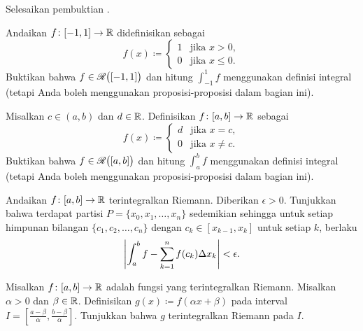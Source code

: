 \begin{exercise}
Selesaikan pembuktian .
\end{exercise}

\begin{exercise}
Andaikan $f \colon [-1,1] \to {\mathbb{R}}$ didefinisikan sebagai
\begin{equation*}
f(x) \coloneqq
\begin{cases}
1 & \text{jika } x > 0, \\
0 & \text{jika } x \leq 0.
\end{cases}
\end{equation*}
Buktikan bahwa $f \in {\mathscr{R}}\bigl([-1,1]\bigr)$ dan
hitung $\int_{-1}^1 f$ menggunakan definisi integral
(tetapi
Anda boleh menggunakan proposisi-proposisi dalam bagian ini).
\end{exercise}

\begin{exercise}
Misalkan $c \in (a,b)$ dan $d \in {\mathbb{R}}$.
Definisikan $f \colon [a,b] \to {\mathbb{R}}$ sebagai
\begin{equation*}
f(x) \coloneqq
\begin{cases}
d & \text{jika } x = c, \\
0 & \text{jika } x \neq c.
\end{cases}
\end{equation*}
Buktikan bahwa $f \in {\mathscr{R}}\bigl([a,b]\bigr)$ dan
hitung
$\int_a^b f$ menggunakan definisi integral
(tetapi
Anda boleh menggunakan proposisi-proposisi dalam bagian ini).
\end{exercise}

\begin{exercise} \label{exercise:taggedpartition}
Andaikan $f \colon [a,b] \to {\mathbb{R}}$ terintegralkan Riemann.  Diberikan $\epsilon
> 0$.  Tunjukkan bahwa terdapat partisi $P = \{ x_0, x_1,
\ldots, x_n \}$
sedemikian sehingga untuk setiap
himpunan bilangan $\{ c_1, c_2, \ldots, c_n \}$ dengan
$c_k \in [x_{k-1},x_k]$ untuk setiap $k$, berlaku
\begin{equation*}
\left\lvert {\int_a^b f - \sum_{k=1}^n f(c_k) \Delta x_k} \right\rvert < \epsilon .
\end{equation*}
\end{exercise}

\begin{exercise}
Misalkan $f \colon [a,b] \to {\mathbb{R}}$ adalah fungsi yang terintegralkan Riemann.
Misalkan $\alpha > 0$ dan $\beta \in {\mathbb{R}}$.
Definisikan $g(x) \coloneqq f(\alpha x + \beta)$ pada interval
$I = [\frac{a-\beta}{\alpha}, \frac{b-\beta}{\alpha}]$.  Tunjukkan
bahwa $g$ terintegralkan Riemann pada $I$.
\end{exercise}

